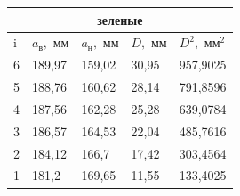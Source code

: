 \documentclass[a4paper,12pt]{article} %
\begin{document}
			\begin{table}[]
\begin{tabular}{|lllll|}
\hline
\multicolumn{5}{|c|}{зеленые}                                                                                                                                                            \\ \hline
\multicolumn{1}{|l|}{i} & \multicolumn{1}{l|}{$a_{\text{в}}, \text{ мм}$} & \multicolumn{1}{l|}{$a_{\text{н}}, \text{ мм}$} & \multicolumn{1}{l|}{$D, \text{ мм}$} & $D^2, \text{ мм}^2$ \\ \hline
\multicolumn{1}{|l|}{6} & \multicolumn{1}{l|}{189,97}                     & \multicolumn{1}{l|}{159,02}                     & \multicolumn{1}{l|}{30,95}           & 957,9025            \\ \hline
\multicolumn{1}{|l|}{5} & \multicolumn{1}{l|}{188,76}                     & \multicolumn{1}{l|}{160,62}                     & \multicolumn{1}{l|}{28,14}           & 791,8596            \\ \hline
\multicolumn{1}{|l|}{4} & \multicolumn{1}{l|}{187,56}                     & \multicolumn{1}{l|}{162,28}                     & \multicolumn{1}{l|}{25,28}           & 639,0784            \\ \hline
\multicolumn{1}{|l|}{3} & \multicolumn{1}{l|}{186,57}                     & \multicolumn{1}{l|}{164,53}                     & \multicolumn{1}{l|}{22,04}           & 485,7616            \\ \hline
\multicolumn{1}{|l|}{2} & \multicolumn{1}{l|}{184,12}                     & \multicolumn{1}{l|}{166,7}                      & \multicolumn{1}{l|}{17,42}           & 303,4564            \\ \hline
\multicolumn{1}{|l|}{1} & \multicolumn{1}{l|}{181,2}                      & \multicolumn{1}{l|}{169,65}                     & \multicolumn{1}{l|}{11,55}           & 133,4025            \\ \hline
\end{tabular}
\end{table}
\end{document}
